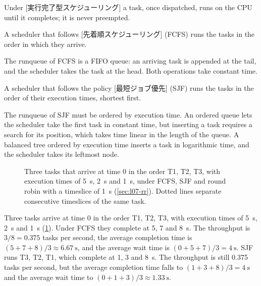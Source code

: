 \documentclass[../main.tex]{subfiles}
\begin{document}
\begin{definition}
  Under [実行完了型スケジューリング] a
  task, once dispatched, runs on the CPU until it completes; it is never
  preempted.
\end{definition}

\begin{definition}[FCFS]
  A scheduler that follows
  [先着順スケジューリング]%
   (FCFS) runs the tasks
  in the order in which they arrive.
\end{definition}

The runqueue of FCFS is a FIFO queue: an arriving task is appended at the
tail, and the scheduler takes the task at the head.  Both operations take
constant time.

\begin{definition}[SJF]
  A scheduler that follows the policy
  [最短ジョブ優先]%
   (SJF) runs the tasks in the order of
  their execution times, shortest first.
\end{definition}

The runqueue of SJF must be ordered by execution time.  An ordered queue
lets the scheduler take the first task in constant time, but inserting a
task requires a search for its position, which takes time linear in the
length of the queue.  A balanced tree ordered by execution time inserts a
task in logarithmic time, and the scheduler takes its leftmost node.

\begin{figure}[htbp]
  \centering
  
  \caption{Three tasks that arrive at time 0 in the order T1, T2, T3, with
    execution times of \SI{5}{\second}, \SI{2}{\second} and
    \SI{1}{\second}, under FCFS, SJF and round robin with a timeslice of
    \SI{1}{\second} (\cref{sec:l07-rr}).  Dotted lines separate consecutive
    timeslices of the same task.}
  \label{fig:l07-gantt}
\end{figure}

\begin{example}
  \label{ex:l07-rtc}
  Three tasks arrive at time 0 in the order T1, T2, T3, with execution
  times of \SI{5}{\second}, \SI{2}{\second} and \SI{1}{\second}
  (\cref{fig:l07-gantt}).  Under FCFS they complete at 5, 7 and
  \SI{8}{\second}.  The throughput is $3/8 = 0.375$ tasks per second, the
  average completion time is $(5+7+8)/3 \approx \SI{6.67}{\second}$, and
  the average wait time is $(0+5+7)/3 = \SI{4}{\second}$.  SJF runs T3, T2,
  T1, which complete at 1, 3 and \SI{8}{\second}.  The throughput is still
  0.375 tasks per second, but the average completion time falls to
  $(1+3+8)/3 = \SI{4}{\second}$ and the average wait time to
  $(0+1+3)/3 \approx \SI{1.33}{\second}$.
\end{example}
\end{document}
